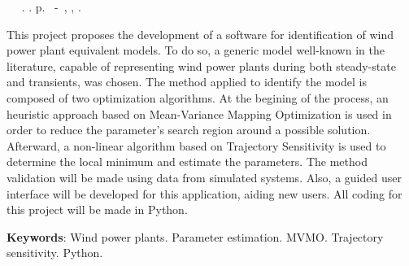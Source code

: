 \begin{resumo}

\begin{flushleft} 
	\setlength{\absparsep}{0pt} %
	\SingleSpacing 
 	\imprimirautorabr~ ~\textbf{\imprimirtitleabstract}.	\imprimirdata.  \pageref{LastPage}p. 
	\imprimirtipotrabalho~-~\imprimirinstituicao, \imprimirlocal, 	\imprimirdata. 
\end{flushleft}

\OnehalfSpacing

This project proposes the development of a software for identification of wind power plant equivalent models. To do so, a generic model well-known in the literature, capable of representing wind power plants during both steady-state and transients, was chosen. The method applied to identify the model is composed of two optimization algorithms. At the begining of the process, an heuristic approach based on Mean-Variance Mapping Optimization is used in order to reduce the parameter's search region around a possible solution. Afterward, a non-linear algorithm based on Trajectory Sensitivity is used to determine the local minimum and estimate the parameters. The method validation will be made using data from simulated systems. Also, a guided user interface will be developed for this application, aiding new users. All coding for this project will be made in Python.


\textbf{Keywords}: Wind power plants. Parameter estimation. MVMO. Trajectory sensitivity. Python.

\end{resumo}
